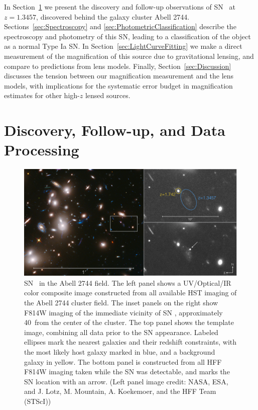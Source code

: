 In Section~\ref{sec:DiscoveryAndFollowup} we present the discovery and
follow-up observations of SN \tomas\ at $z=1.3457$, discovered behind the
galaxy cluster Abell 2744.  Sections~\ref{sec:Spectroscopy}
and \ref{sec:PhotometricClassification} describe the spectroscopy and
photometry of this SN, leading to a classification of the object as a
normal Type Ia SN.  In Section~\ref{sec:LightCurveFitting} we make a
direct measurement of the magnification of this source due to
gravitational lensing, and compare to predictions from lens models.
Finally, Section~\ref{sec:Discussion} discusses the tension between
our magnification measurement and the lens models, with implications
for the systematic error budget in magnification estimates for other
high-$z$ lensed sources.


\section{Discovery, Follow-up, and Data Processing}
\label{sec:DiscoveryAndFollowup}

\begin{figure}
\begin{center}
\includegraphics[width=\textwidth]{FIG/discovery_image_lowres}
\caption{  \label{fig:DiscoveryImage} 
SN \tomas\ in the Abell 2744 field.  The left panel shows a
UV/Optical/IR color composite image constructed from all available HST
imaging of the Abell 2744 cluster field.  The inset panels on the right
show F814W imaging of the immediate vicinity of SN \tomas,
approximately 40\arcsec\ from the center of the cluster. The top panel
shows the template image, combining all data prior to the SN
appearance.  Labeled ellipses mark the nearest galaxies and their
 redshift constraints, with the most likely host
galaxy marked in blue, and a background galaxy in yellow. The bottom
panel is constructed from all HFF F814W imaging taken while the SN was
detectable, and marks the SN location with an arrow.  (Left panel
image credit: NASA, ESA, and J. Lotz, M. Mountain, A. Koekemoer, and
the HFF Team (STScI)) }
\end{center}
\end{figure}


